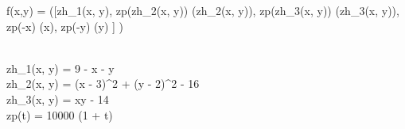 f(x,y) = \max([zh_1(x, y), zp(zh_2(x, y)) (zh_2(x, y)), zp(zh_3(x, y)) (zh_3(x, y)), zp(-x) \cdot {}(x), zp(-y) \cdot {}(y) ] )

\\
zh_1(x, y) = 9 - x - y \\
zh_2(x, y) = (x - 3)^2 + (y - 2)^2 - 16 \\
zh_3(x, y) = xy - 14 \\
zp(t) = 10000 (1 + t)
